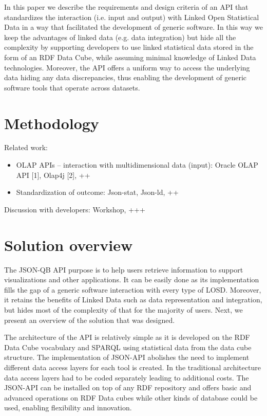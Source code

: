 \documentclass{llncs}
\begin{document}
In this paper we describe the requirements and design criteria of an API that standardizes the interaction (i.e. input and output) with Linked Open Statistical Data in a way that facilitated the development of generic software. In this way we keep the advantages of linked data (e.g. data integration) but hide all the complexity by supporting developers to use linked statistical data stored in the form of an RDF Data Cube, while assuming minimal knowledge of Linked Data technologies. Moreover, the API offers a uniform way to access the underlying data hiding any data discrepancies, thus enabling the development of generic software tools that operate across datasets. 

\section{Methodology}\label{sec:methodology}

Related work:
\begin{itemize}
\item  OLAP APIs – interaction with multidimensional data (input): Oracle OLAP API [1], Olap4j [2], ++
\item Standardization of outcome: Json-stat, Json-ld, ++
\end{itemize}

Discussion with developers: Workshop, +++

\section{Solution overview}\label{sec:overview}

The JSON-QB API purpose is to help users retrieve information to support visualizations and other applications. It can be easily done as its implementation fills the gap of a generic software interaction with every type of LOSD. Moreover, it retains the benefits of Linked Data such as data representation and integration, but hides most of the complexity of that for the majority of users. Next, we present an overview of the solution that was designed.

The architecture of the API is relatively simple as it is developed on the RDF Data Cube vocabulary and SPARQL using statistical data from the data cube structure. The implementation of JSON-API abolishes the need to implement different data access layers for each tool is created. In the traditional architecture data access layers had to be coded separately leading to additional costs. The JSON-API can be installed on top of any RDF repository and offers basic and advanced operations on RDF Data cubes while other kinds of database could be used, enabling flexibility and innovation.
\end{document}
